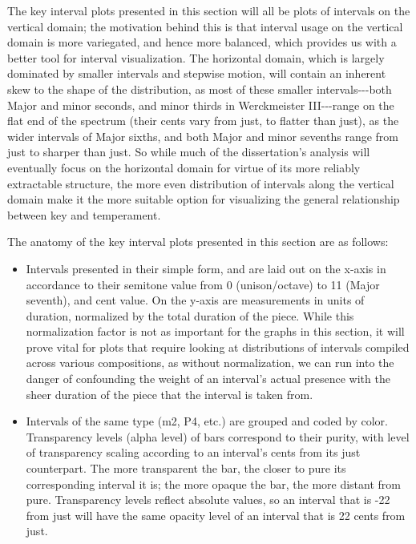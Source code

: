 The key interval plots presented in this section will all be plots of
intervals on the vertical domain; the motivation behind this is that
interval usage on the vertical domain is more variegated, and hence more
balanced, which provides us with a better tool for interval
visualization. The horizontal domain, which is largely dominated by
smaller intervals and stepwise motion, will contain an inherent skew to
the shape of the distribution, as most of these smaller
intervals-\/-\/-both Major and minor seconds, and minor thirds in
Werckmeister III-\/-\/-range on the flat end of the spectrum (their
cents vary from just, to flatter than just), as the wider intervals of
Major sixths, and both Major and minor sevenths range from just to
sharper than just. So while much of the dissertation's analysis will
eventually focus on the horizontal domain for virtue of its more
reliably extractable structure, the more even distribution of intervals
along the vertical domain make it the more suitable option for
visualizing the general relationship between key and temperament.

The anatomy of the key interval plots presented in this section are as
follows:

\begin{itemize}
\tightlist
\item
  Intervals presented in their simple form, and are laid out on the
  x-axis in accordance to their semitone value from 0 (unison/octave) to
  11 (Major seventh), and cent value. On the y-axis are measurements in
  units of duration, normalized by the total duration of the piece.
  While this normalization factor is not as important for the graphs in
  this section, it will prove vital for plots that require looking at
  distributions of intervals compiled across various compositions, as
  without normalization, we can run into the danger of confounding the
  weight of an interval's actual presence with the sheer duration of the
  piece that the interval is taken from.
\item
  Intervals of the same type (m2, P4, etc.) are grouped and coded by
  color. Transparency levels (alpha level) of bars correspond to their
  purity, with level of transparency scaling according to an interval's
  cents from its just counterpart. The more transparent the bar, the
  closer to pure its corresponding interval it is; the more opaque the
  bar, the more distant from pure. Transparency levels reflect absolute
  values, so an interval that is -22 from just will have the same
  opacity level of an interval that is 22 cents from just.
\end{itemize}


